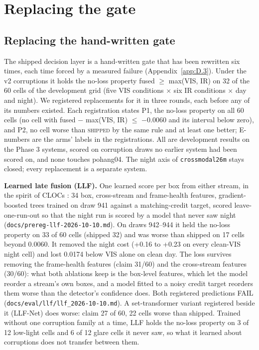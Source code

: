 \documentclass[journal,onecolumn]{IEEEtran}
\begin{document}
\FloatBarrier
\section{Replacing the gate}\label{app:F}
\subsection{Replacing the hand-written gate}\label{app:F.1}
The shipped decision layer is a hand-written gate that has been rewritten six times, each time forced by a measured failure (Appendix~\ref{app:D.3}). Under the v2 corruptions it holds the no-loss property fused $\geq$ max(VIS, IR) on 32 of the 60 cells of the development grid (five VIS conditions $\times$ six IR conditions $\times$ day and night). We registered replacements for it in three rounds, each before any of its numbers existed. Each registration states P1, the no-loss property on all 60 cells (no cell with fused $-$ max(VIS, IR) $\leq$ $-$0.0060 and its interval below zero), and P2, no cell worse than \textsc{shipped} by the same rule and at least one better; E-numbers are the arms' labels in the registrations. All are development results on the Phase 3 systems, scored on corruption draws no earlier system had been scored on, and none touches pohang04. The night axis of \texttt{crossmodal26m} stays closed; every replacement is a separate system.

\textbf{Learned late fusion (LLF).} One learned score per box from either stream, in the spirit of CLOCs \cite{pang2020clocs}: 34 box, cross-stream and frame-health features, gradient-boosted trees trained on draw 941 against a matching-credit target, scored leave-one-run-out so that the night run is scored by a model that never saw night (\texttt{docs/\allowbreak{}prereg-\allowbreak{}llf-\allowbreak{}2026-\allowbreak{}10-\allowbreak{}10.md}). On draws 942--944 it held the no-loss property on 33 of 60 cells (shipped 32) and was worse than shipped on 17 cells beyond 0.0060. It removed the night cost (+0.16 to +0.23 on every clean-VIS night cell) and lost 0.0174 below VIS alone on clean day. The loss survives removing the frame-health features (claim 31/60) and the cross-stream features (30/60): what both ablations keep is the box-level features, which let the model reorder a stream's own boxes, and a model fitted to a noisy credit target reorders them worse than the detector's confidence does. Both registered predictions FAIL (\texttt{docs/\allowbreak{}eval/\allowbreak{}llf/\allowbreak{}llf\_\allowbreak{}2026-\allowbreak{}10-\allowbreak{}10.md}). A set-transformer variant registered beside it (LLF-Net) does worse: claim 27 of 60, 22 cells worse than shipped. Trained without one corruption family at a time, LLF holds the no-loss property on 3 of 12 low-light cells and 6 of 12 glare cells it never saw, so what it learned about corruptions does not transfer between them.
\end{document}
